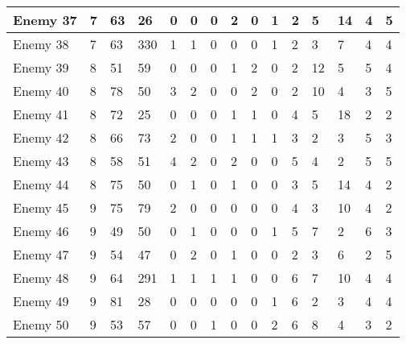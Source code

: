 \begin{sidewaystable}[!h]
{\begin{tabular}{|l|l|l|l|l|l|l|l|l|l|l|l|l|l|l|}
			Enemy 37 & 7 & 63 & 26 & 0 & 0 & 0 & 2 & 0 & 1 & 2 & 5 & 14 & 4 & 5 \\ \hline
			Enemy 38 & 7 & 63 & 330 & 1 & 1 & 0 & 0 & 0 & 1 & 2 & 3 & 7 & 4 & 4 \\ \hline
			Enemy 39 & 8 & 51 & 59 & 0 & 0 & 0 & 1 & 2 & 0 & 2 & 12 & 5 & 5 & 4 \\ \hline
			Enemy 40 & 8 & 78 & 50 & 3 & 2 & 0 & 0 & 2 & 0 & 2 & 10 & 4 & 3 & 5 \\ \hline
			Enemy 41 & 8 & 72 & 25 & 0 & 0 & 0 & 1 & 1 & 0 & 4 & 5 & 18 & 2 & 2 \\ \hline
			Enemy 42 & 8 & 66 & 73 & 2 & 0 & 0 & 1 & 1 & 1 & 3 & 2 & 3 & 5 & 3 \\ \hline
			Enemy 43 & 8 & 58 & 51 & 4 & 2 & 0 & 2 & 0 & 0 & 5 & 4 & 2 & 5 & 5 \\ \hline
			Enemy 44 & 8 & 75 & 50 & 0 & 1 & 0 & 1 & 0 & 0 & 3 & 5 & 14 & 4 & 2 \\ \hline
			Enemy 45 & 9 & 75 & 79 & 2 & 0 & 0 & 0 & 0 & 0 & 4 & 3 & 10 & 4 & 2 \\ \hline
			Enemy 46 & 9 & 49 & 50 & 0 & 1 & 0 & 0 & 0 & 1 & 5 & 7 & 2 & 6 & 3 \\ \hline
			Enemy 47 & 9 & 54 & 47 & 0 & 2 & 0 & 1 & 0 & 0 & 2 & 3 & 6 & 2 & 5 \\ \hline
			Enemy 48 & 9 & 64 & 291 & 1 & 1 & 1 & 1 & 0 & 0 & 6 & 7 & 10 & 4 & 4 \\ \hline
			Enemy 49 & 9 & 81 & 28 & 0 & 0 & 0 & 0 & 0 & 1 & 6 & 2 & 3 & 4 & 4 \\ \hline
			Enemy 50 & 9 & 53 & 57 & 0 & 0 & 1 & 0 & 0 & 2 & 6 & 8 & 4 & 3 & 2 \\ \hline
		\end{tabular}%
	}
\end{sidewaystable}
\clearpage


